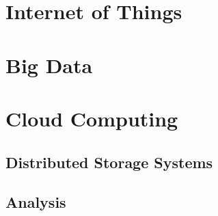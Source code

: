 \section{Internet of Things}

\section{Big Data}

\section{Cloud Computing}
\subsection{Distributed Storage Systems}
\subsection{Analysis}


\section{}
